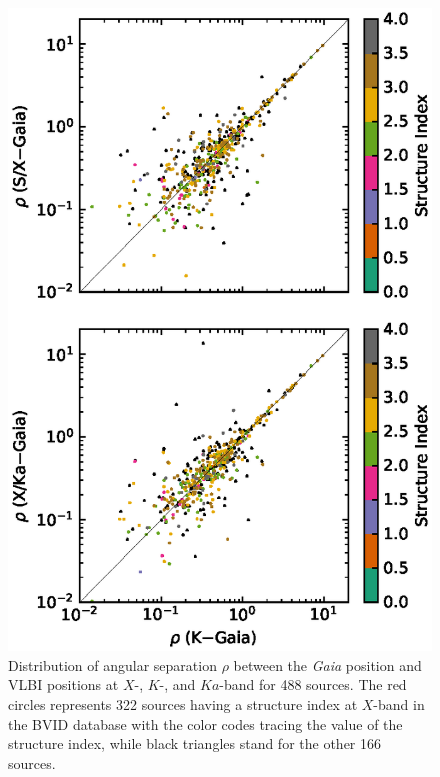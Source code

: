 \documentclass{aa-note}   %
\begin{document}
\begin{figure}[hbtp]
    \centering
    \includegraphics[width=\columnwidth]{figs/rho-com-vs-si}
    \caption[]{\label{fig:rho-com}
        Distribution of angular separation $\rho$ between the {\it Gaia} position and VLBI positions at $X$-, $K$-, and $Ka$-band for 488 sources.
        The red circles represents 322 sources having a structure index at $X$-band in the BVID database with the color codes tracing the value of the structure index, while black triangles stand for the other 166 sources.
    }
\end{figure}
\end{document}
